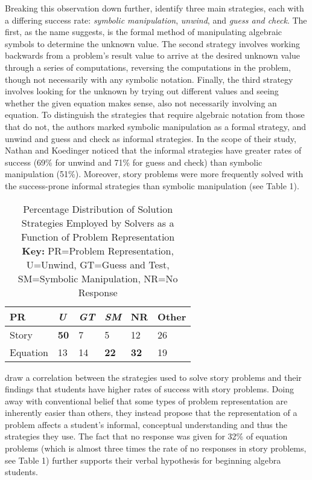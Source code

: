 \documentclass[10pt,letterpaper]{article}
\begin{document}
	Breaking this observation down further,  identify three main strategies, each with a differing success rate: \textit{symbolic manipulation}, \textit{unwind}, and \textit{guess and check}. The first, as the name suggests, is the formal method of manipulating algebraic symbols to determine the unknown value. The second strategy involves working backwards from a problem's result value to arrive at the desired unknown value through a series of computations, reversing the computations in the problem, though not necessarily with any symbolic notation. Finally, the third strategy involves looking for the unknown by trying out different values and seeing whether the given equation makes sense, also not necessarily involving an equation. To distinguish the strategies that require algebraic notation from those that do not, the authors marked symbolic manipulation as a formal strategy, and unwind and guess and check as informal strategies. In the scope of their study, Nathan and Koedinger noticed that the informal strategies have greater rates of success (69\% for unwind and 71\% for guess and check) than symbolic manipulation (51\%). Moreover, story problems were more frequently solved with the success-prone informal strategies than symbolic manipulation (see Table 1). %
	\begin{table}[!ht]
		\begin{center} 
			\label{strategies_employed} 
			\vskip 0.12in
			\begin{tabular}{llllll} 
				\hline
				PR    &  \textit{U} & \textit{GT} & \textit{SM} & NR & Other \\
				\hline
				Story        &   \textbf{50} & 7 & 5 & 12 & 26\\
				Equation   &   13 & 14 & \textbf{22} & \textbf{32} & 19 \\
				\hline
			\end{tabular} 
			\caption{Percentage Distribution of Solution Strategies Employed by Solvers as a Function of Problem Representation \cite{KoedNath2004}\\
			\textbf{Key:} PR=Problem Representation, U=Unwind, GT=Guess and Test, SM=Symbolic Manipulation, NR=No Response} 
		\end{center} 
	\end{table}
	
	 draw a correlation between the strategies used to solve story problems and their findings that students have higher rates of success with story problems. Doing away with conventional belief that some types of problem representation are inherently easier than others, they instead propose that the representation of a problem affects a student's informal, conceptual understanding and thus the strategies they use. The fact that no response was given for 32\% of equation problems (which is almost three times the rate of no responses in story problems, see Table 1) %
	further supports their verbal hypothesis for beginning algebra students.
	
\end{document}
